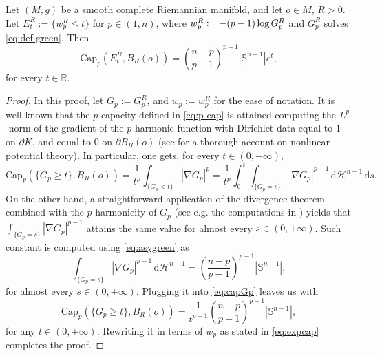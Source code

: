 \documentclass[a4paper,12pt,reqno]{amsart}
\numberwithin{equation}{section}
\theoremstyle{plain}
\theoremstyle{definition}
\theoremstyle{remark}
\newcommand{\abs}[1]{\left\lvert#1\right\rvert}
\newcommand{\eqdef}{\ensuremath{\vcentcolon=}}
\newcommand{\haus}{\mathcal{H}}
\newcommand{\de}{\ensuremath{\,\mathrm d}} %
\begin{document}
{\begin{lemma}
\label{lem:expcap}
Let $(M, g)$ be a smooth complete Riemannian manifold, and let $o \in M$, $R > 0$. Let $E_t^R := \{w_p^R \leq t\}$ for $p \in (1, n)$, where $w_p^R \eqdef -(p-1) \log G_p^R$ and $G_p^R$ solves \eqref{eq:def-green}. Then
\begin{equation}
\label{eq:expcap}
    \mathrm{Cap}_p(E_t^R, B_R(o)) = \left(\frac{n-p}{p-1}\right)^{p-1}\abs{\mathbb{S}^{n-1}}e^t ,
\end{equation}
for every $t\in\mathbb R$.
\end{lemma}

\begin{proof}
In this proof, let $G_p := G_p^{R}$, and $w_p := w_p^{R}$ for the ease of notation.
It is well-known that the $p$-capacity defined in \eqref{eq:p-cap} is attained computing the $L^p$-norm of the gradient of the $p$-harmonic function with Dirichlet data equal to $1$ on $\partial K$, and equal to $0$ on $\partial B_R(o)$ (see \cite{heinonen-kilpelainen-martio} for a thorough account on nonlinear potential theory). In particular, one gets, for every $t\in (0,+\infty)$,
\begin{equation}
    \label{eq:capGp}
    \mathrm{Cap}_p(\{G_p \geq t\}, B_R(o)) = \frac{1}{t^p}\int_{\{G_p < t\}} \abs{\nabla G_p}^{p} = \frac{1}{t^p}\int_0^t\int_{\{G_p = s\}} \abs{\nabla G_p}^{p-1} \de \haus^{n-1} \de s.
\end{equation}
On the other hand, a straightforward application of the divergence theorem combined with the $p$-harmonicity of $G_p$ (see e.g. the computations in \cite[Proposition 2.8]{benatti2022minkowski}) yields that $\int_{\{G_p = s\}} \abs{\nabla G_p}^{p-1}$ attains the same value for almost every $s\in (0,+\infty)$. Such constant is computed using \eqref{eq:asygreen} as
\begin{equation*}
    \label{eq:constantconasygreen}
    \int_{\{G_p = s\}} \abs{\nabla G_p}^{p-1}  \de \haus^{n-1}  = \left(\frac{n-p}{p-1}\right)^{p-1}\abs{\mathbb{S}^{n-1}},
\end{equation*}
for almost every $s \in (0, + \infty)$. Plugging it into \eqref{eq:capGp} leaves us with 
\begin{equation}
\label{eq:p-capalmost}
\mathrm{Cap}_p(\{G_p \geq t\}, B_R(o)) = \frac{1}{t^{p-1}} \left(\frac{n-p}{p-1}\right)^{p-1}\abs{\mathbb{S}^{n-1}},
\end{equation}
for any $t \in (0, + \infty)$.
Rewriting it in terms of $w_p$ as stated in \eqref{eq:expcap} completes the proof.
\end{proof}

}
\end{document}
